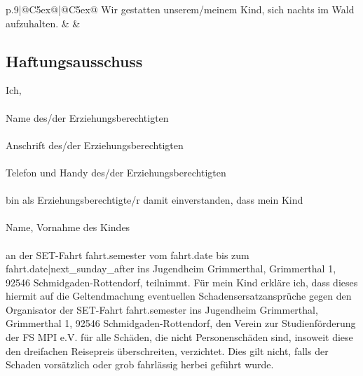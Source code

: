 {{{{{{\begin{longtable}{p{.9\linewidth}|@{}C{5ex}@{}|@{}C{5ex}@{}}
    Wir gestatten unserem/meinem Kind, sich nachts im Wald aufzuhalten. & \CheckBox[borderwidth=0.1mm,name=cb1,width=5ex,height=1.5ex]{} & \CheckBox[borderwidth=0.1mm,name=cb1,width=5ex,height=1.5ex]{} \\ \hline
    \end{longtable}
    {%

    \subsection*{Haftungsausschuss}
    Ich,\\
    \\
    \TextField[charsize={12pt},multiline=true,height={1cm},width={\linewidth},name={guardian},bordercolor={0.2 0.2 0.7}]{}\newline
    Name des/der Erziehungsberechtigten\\
    \\
    \TextField[charsize={12pt},multiline=true,height={1cm},width={\linewidth},name={guardian_adress},bordercolor={0.2 0.2 0.7}]{}\newline
    Anschrift des/der Erziehungsberechtigten\\
    \\
    \TextField[charsize={12pt},multiline=true,height={2.5cm},width={\linewidth},name={guardian_contact},bordercolor={0.2 0.2 0.7}]{}\newline
    Telefon und Handy des/der Erziehungsberechtigten\\
    \\
    bin als Erziehungsberechtigte/r damit einverstanden, dass mein Kind\\
    \\
    \TextField[charsize={12pt},multiline=true,height={1cm},width={\linewidth},name={name},bordercolor={0.2 0.2 0.7},default={ {{ participant.surname|latex_escape }}, {{ participant.firstname|latex_escape }}}]{}\newline
    Name, Vornahme des Kindes\\
    \\
    an der SET-Fahrt {{ fahrt.semester }} vom {{ fahrt.date }} bis zum {{ fahrt.date|next_sunday_after }} ins Jugendheim Grimmerthal, Grimmerthal 1, 92546 Schmidgaden-Rottendorf, teilnimmt. Für mein Kind erkläre ich, dass
    dieses hiermit auf die Geltendmachung eventuellen Schadensersatzansprüche gegen den Organisator
    der SET-Fahrt {{ fahrt.semester }} ins Jugendheim Grimmerthal, Grimmerthal 1, 92546 Schmidgaden-Rottendorf,
    den Verein zur Studienförderung der FS MPI e.V. für alle Schäden, die nicht Personenschäden sind,
    insoweit diese den dreifachen Reisepreis überschreiten, verzichtet. Dies gilt nicht, falls der Schaden
    vorsätzlich oder grob fahrlässig herbei geführt wurde.\\
    \\
    {%

}}}}}}}}
